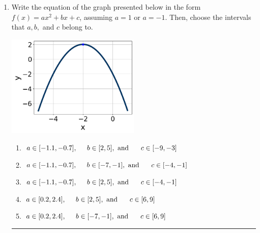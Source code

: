 \documentclass[14pt]{extbook}
\newcommand{\litem}[1]{\item#1\hspace*{-1cm}\rule{\textwidth}{0.4pt}}
\begin{document}
\begin{enumerate}
{\begin{enumerate}[label=\Alph*.]
\end{enumerate} }
\litem{
Write the equation of the graph presented below in the form $f(x)=ax^2+bx+c$, assuming  $a=1$ or $a=-1$. Then, choose the intervals that $a, b,$ and $c$ belong to.
\begin{center}
    \includegraphics[width=0.5\textwidth]{../Figures/quadraticGraphToEquationC.png}
\end{center}
\begin{enumerate}[label=\Alph*.]
\item \( a \in [-1.1, -0.7], \hspace*{5mm} b \in [2, 5], \text{ and } \hspace*{5mm} c \in [-9, -3] \)
\item \( a \in [-1.1, -0.7], \hspace*{5mm} b \in [-7, -1], \text{ and } \hspace*{5mm} c \in [-4, -1] \)
\item \( a \in [-1.1, -0.7], \hspace*{5mm} b \in [2, 5], \text{ and } \hspace*{5mm} c \in [-4, -1] \)
\item \( a \in [0.2, 2.4], \hspace*{5mm} b \in [2, 5], \text{ and } \hspace*{5mm} c \in [6, 9] \)
\item \( a \in [0.2, 2.4], \hspace*{5mm} b \in [-7, -1], \text{ and } \hspace*{5mm} c \in [6, 9] \)


\end{enumerate}}
\end{enumerate}
\end{document}
